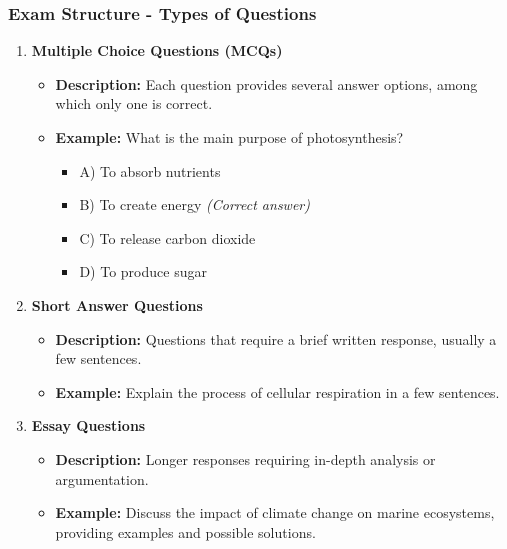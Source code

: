 \documentclass{beamer}
\begin{document}
\begin{frame}[fragile]
    \frametitle{Exam Structure - Types of Questions}
    \begin{enumerate}
        \item \textbf{Multiple Choice Questions (MCQs)} 
            \begin{itemize}
                \item \textbf{Description:} Each question provides several answer options, among which only one is correct.
                \item \textbf{Example:} What is the main purpose of photosynthesis?
                    \begin{itemize}
                        \item A) To absorb nutrients
                        \item B) To create energy \textit{(Correct answer)}
                        \item C) To release carbon dioxide
                        \item D) To produce sugar
                    \end{itemize}
            \end{itemize}
        \item \textbf{Short Answer Questions} 
            \begin{itemize}
                \item \textbf{Description:} Questions that require a brief written response, usually a few sentences.
                \item \textbf{Example:} Explain the process of cellular respiration in a few sentences.
            \end{itemize}
        \item \textbf{Essay Questions}
            \begin{itemize}
                \item \textbf{Description:} Longer responses requiring in-depth analysis or argumentation.
                \item \textbf{Example:} Discuss the impact of climate change on marine ecosystems, providing examples and possible solutions.
            \end{itemize}
    \end{enumerate}
\end{frame}
\end{document}
